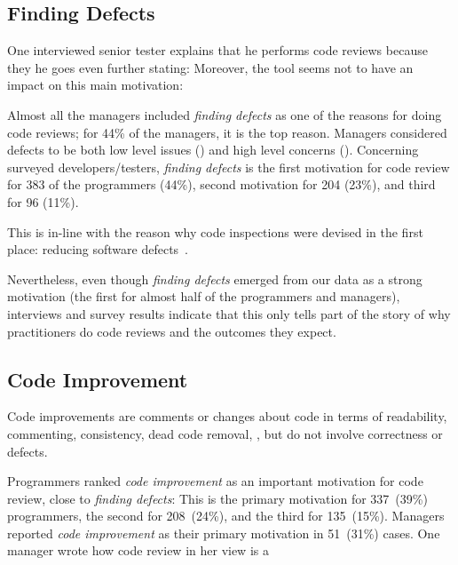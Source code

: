 \subsection{Finding Defects}

One interviewed senior tester explains that he performs code reviews because
they  he goes even further stating:
 Moreover, the tool seems not to have an impact on this main
motivation: 

Almost all the managers included \emph{finding defects} as one of the reasons for
doing code reviews; for 44\% of the managers, it is the top reason. Managers
considered defects to be both low level issues (\eg {}) and high level concerns (\eg {}). Concerning surveyed developers/testers, \emph{finding defects} is the
first motivation for code review for 383 of the programmers (44\%), second
motivation for 204 (23\%), and third for 96 (11\%).

This is in-line with the reason why code inspections were devised in the first
place: reducing software defects~\cite{ackerman1984software}.

Nevertheless, even though \emph{finding defects} emerged from our data as a strong
motivation (the first for almost half of the programmers and managers),
interviews and survey results indicate that this only tells part of the story
of why practitioners do code reviews and the outcomes they expect.

\subsection{Code Improvement}

Code improvements are comments or changes about code in terms of readability,
commenting, consistency, dead code removal, \etc, but do not involve
correctness or defects.

Programmers ranked \emph{code improvement} as an important motivation for code
review, close to \emph{finding defects}: This is the primary motivation for 337~(39\%)
programmers, the second for 208~(24\%), and the third for 135~(15\%).
Managers reported \emph{code improvement} as their primary motivation in 51~(31\%) cases. One manager wrote how code review in her view is a

